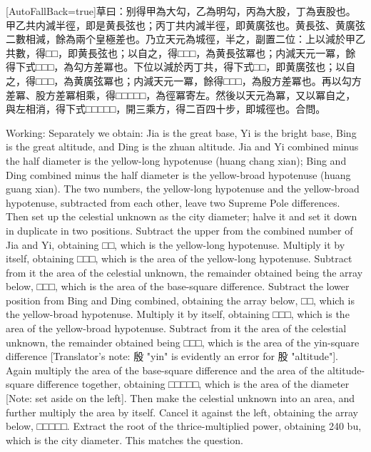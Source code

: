\documentclass[11pt]{article}
\newcommand{\zhsmall}{\footnotesize\color{black!70}}
\newcommand{\unitlabel}[1]{\marginpar{\raggedleft\tiny\color{gray}#1}}
\newenvironment{unitzh}{\par\CJKfontspec{Noto Serif CJK SC}[AutoFallBack=true]\large\linespread{1.25}\selectfont}{\par}
\newenvironment{uniten}{\par\small\color{black!85}}{\par\medskip}
\begin{document}
\begin{unitzh}\unitlabel{ceyuan-022.28}草曰：别得甲為大勾，乙為明勾，丙為大股，丁為叀股也。甲乙共内減半徑，即是黄長弦也；丙丁共内減半徑，即黄廣弦也。黄長弦、黄廣弦二數相減，餘為兩个皇極差也。乃立天元為城徑，半之，副置二位：上以減於甲乙共數，得□□，即黄長弦也；以自之，得□□□，為黄長弦冪也；内減天元一冪，餘得下式□□□，為勾方差冪也。下位以減於丙丁共，得下式□□，即黄廣弦也；以自之，得□□□，為黄廣弦冪也；内減天元一冪，餘得□□□，為殷方差冪也。再以勾方差冪、股方差冪相乘，得□□□□□，為徑冪{\zhsmall 寄左}。然後以天元為冪，又以冪自之，與左相消，得下式□□□□□，開三乘方，得二百四十步，即城徑也。合問。\end{unitzh}
\begin{uniten}Working: Separately we obtain: Jia is the great base, Yi is the bright base, Bing is the great altitude, and Ding is the zhuan altitude. Jia and Yi combined minus the half diameter is the yellow-long hypotenuse (huang chang xian); Bing and Ding combined minus the half diameter is the yellow-broad hypotenuse (huang guang xian). The two numbers, the yellow-long hypotenuse and the yellow-broad hypotenuse, subtracted from each other, leave two Supreme Pole differences. Then set up the celestial unknown as the city diameter; halve it and set it down in duplicate in two positions. Subtract the upper from the combined number of Jia and Yi, obtaining □□, which is the yellow-long hypotenuse. Multiply it by itself, obtaining □□□, which is the area of the yellow-long hypotenuse. Subtract from it the area of the celestial unknown, the remainder obtained being the array below, □□□, which is the area of the base-square difference. Subtract the lower position from Bing and Ding combined, obtaining the array below, □□, which is the yellow-broad hypotenuse. Multiply it by itself, obtaining □□□, which is the area of the yellow-broad hypotenuse. Subtract from it the area of the celestial unknown, the remainder obtained being □□□, which is the area of the yin-square difference [Translator's note: 殷 "yin" is evidently an error for 股 "altitude"]. Again multiply the area of the base-square difference and the area of the altitude-square difference together, obtaining □□□□□, which is the area of the diameter [Note: set aside on the left]. Then make the celestial unknown into an area, and further multiply the area by itself. Cancel it against the left, obtaining the array below, □□□□□. Extract the root of the thrice-multiplied power, obtaining 240 bu, which is the city diameter. This matches the question.\end{uniten}
\end{document}
